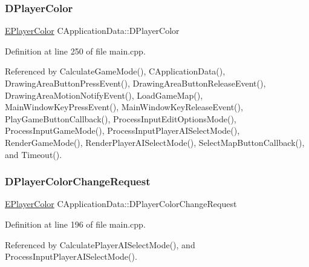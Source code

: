 \subsubsection{\texorpdfstring{D\+Player\+Color}{DPlayerColor}}
{\footnotesize\ttfamily \hyperlink{GameDataTypes_8h_aafb0ca75933357ff28a6d7efbdd7602f}{E\+Player\+Color} C\+Application\+Data\+::\+D\+Player\+Color\hspace{0.3cm}{\ttfamily [protected]}}



Definition at line 250 of file main.\+cpp.



Referenced by Calculate\+Game\+Mode(), C\+Application\+Data(), Drawing\+Area\+Button\+Press\+Event(), Drawing\+Area\+Button\+Release\+Event(), Drawing\+Area\+Motion\+Notify\+Event(), Load\+Game\+Map(), Main\+Window\+Key\+Press\+Event(), Main\+Window\+Key\+Release\+Event(), Play\+Game\+Button\+Callback(), Process\+Input\+Edit\+Options\+Mode(), Process\+Input\+Game\+Mode(), Process\+Input\+Player\+A\+I\+Select\+Mode(), Render\+Game\+Mode(), Render\+Player\+A\+I\+Select\+Mode(), Select\+Map\+Button\+Callback(), and Timeout().

\hypertarget{classCApplicationData_ae72fd0906b911705aafb9df8cf610f97}{}\label{classCApplicationData_ae72fd0906b911705aafb9df8cf610f97} 
\subsubsection{\texorpdfstring{D\+Player\+Color\+Change\+Request}{DPlayerColorChangeRequest}}
{\footnotesize\ttfamily \hyperlink{GameDataTypes_8h_aafb0ca75933357ff28a6d7efbdd7602f}{E\+Player\+Color} C\+Application\+Data\+::\+D\+Player\+Color\+Change\+Request\hspace{0.3cm}{\ttfamily [protected]}}



Definition at line 196 of file main.\+cpp.



Referenced by Calculate\+Player\+A\+I\+Select\+Mode(), and Process\+Input\+Player\+A\+I\+Select\+Mode().

\hypertarget{classCApplicationData_a5231cd0c9d8bb76ab32c7f2a114e41f1}{}\label{classCApplicationData_a5231cd0c9d8bb76ab32c7f2a114e41f1} 
